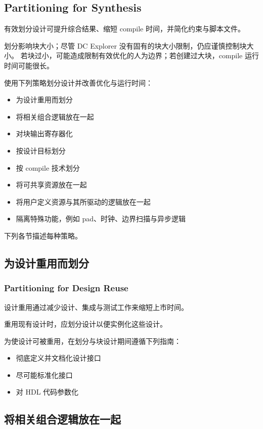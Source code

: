 \subsection*{Partitioning for Synthesis}

有效划分设计可提升综合结果、缩短 compile 时间，并简化约束与脚本文件。

划分影响块大小；尽管 DC Explorer 没有固有的块大小限制，仍应谨慎控制块大小。
若块过小，可能造成限制有效优化的人为边界；若创建过大块，compile 运行时间可能很长。

使用下列策略划分设计并改善优化与运行时间：
\begin{itemize}
  \item 为设计重用而划分
  \item 将相关组合逻辑放在一起
  \item 对块输出寄存器化
  \item 按设计目标划分
  \item 按 compile 技术划分
  \item 将可共享资源放在一起
  \item 将用户定义资源与其所驱动的逻辑放在一起
  \item 隔离特殊功能，例如 pad、时钟、边界扫描与异步逻辑
\end{itemize}

下列各节描述每种策略。

\subsection{为设计重用而划分}
\subsubsection*{Partitioning for Design Reuse}

设计重用通过减少设计、集成与测试工作来缩短上市时间。

重用现有设计时，应划分设计以便实例化这些设计。

为使设计可被重用，在划分与块设计期间遵循下列指南：
\begin{itemize}
  \item 彻底定义并文档化设计接口
  \item 尽可能标准化接口
  \item 对 HDL 代码参数化
\end{itemize}

\subsection{将相关组合逻辑放在一起}
